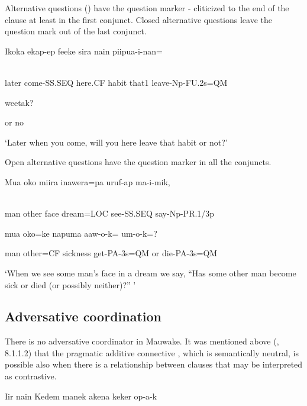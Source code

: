 Alternative questions () have the question marker - cliticized to the end of the clause at least in the first conjunct. Closed alternative questions leave the question mark out of the last conjunct. 

\ea%
\label{ex:x1386}
\gll Ikoka  ekap-ep  feeke  sira  nain  piipua-i-nan= \\
      \\
\glt
\z

later  come-SS.SEQ  here.CF  habit  that1  leave-Np-FU.2s=QM

  weetak?

or  no

`Later when you come, will you here leave that habit or not?'

Open alternative questions have the question marker in all the conjuncts.

\ea%
\label{ex:x1384}
\gll Mua  oko  miira  inawera=pa  uruf-ap  ma-i-mik, \\
      \\
\glt
\z

man  other  face  dream=LOC  see-SS.SEQ  say-Np-PR.1/3p

mua  oko=ke  napuma  aaw-o-k=    um-o-k=?

man  other=CF  sickness  get-PA-3s=QM  or  die-PA-3s=QM

`When we see some man's face in a dream we say, ``Has some other man become sick or died (or possibly neither)?'' '

\subsection{Adversative coordination}
\hypertarget{RefHeading23021935131865}{}
There is no adversative coordinator in Mauwake. It was mentioned above  (, 8.1.1.2) that the pragmatic additive connective , which is semantically neutral, is possible also when there is a relationship between clauses that may be interpreted as contrastive. 

\ea%
\label{ex:x1388}
\gll Iir  nain  Kedem  manek  akena  keker  op-a-k \\
      \\
\glt
\z

